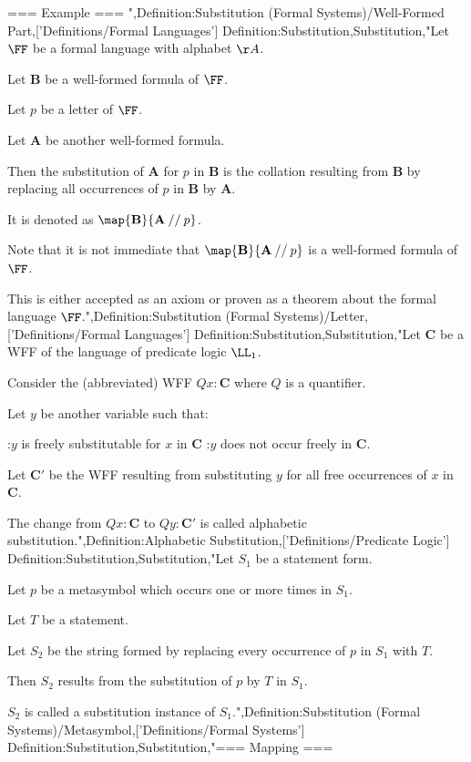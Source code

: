 === Example ===
",Definition:Substitution (Formal Systems)/Well-Formed Part,['Definitions/Formal Languages']
Definition:Substitution,Substitution,"Let $\FF$ be a formal language with alphabet $\AA$.

Let $\mathbf B$ be a well-formed formula of $\FF$.

Let $p$ be a letter of $\FF$.

Let $\mathbf A$ be another well-formed formula.

Then the substitution of $\mathbf A$ for $p$ in $\mathbf B$ is the collation resulting from $\mathbf B$ by replacing all occurrences of $p$ in $\mathbf B$ by $\mathbf A$.

It is denoted as $\map {\mathbf B} {\mathbf A \mathbin {//} p}$.


Note that it is not immediate that $\map {\mathbf B} {\mathbf A \mathbin {//} p}$ is a well-formed formula of $\FF$.

This is either accepted as an axiom or proven as a theorem about the formal language $\FF$.",Definition:Substitution (Formal Systems)/Letter,['Definitions/Formal Languages']
Definition:Substitution,Substitution,"Let $\mathbf C$ be a WFF of the language of predicate logic $\LL_1$.

Consider the (abbreviated) WFF $Q x: \mathbf C$ where $Q$ is a quantifier.

Let $y$ be another variable such that:

:$y$ is freely substitutable for $x$ in $\mathbf C$
:$y$ does not occur freely in $\mathbf C$.


Let $\mathbf C'$ be the WFF resulting from substituting $y$ for all free occurrences of $x$ in $\mathbf C$.

The change from $Q x: \mathbf C$ to $Q y: \mathbf C'$ is called alphabetic substitution.",Definition:Alphabetic Substitution,['Definitions/Predicate Logic']
Definition:Substitution,Substitution,"Let $S_1$ be a statement form.

Let $p$ be a metasymbol which occurs one or more times in $S_1$.

Let $T$ be a statement.

Let $S_2$ be the string formed by replacing every occurrence of $p$ in $S_1$ with $T$.


Then $S_2$ results from the substitution of $p$ by $T$ in $S_1$.

$S_2$ is called a substitution instance of $S_1$.",Definition:Substitution (Formal Systems)/Metasymbol,['Definitions/Formal Systems']
Definition:Substitution,Substitution,"=== Mapping ===

